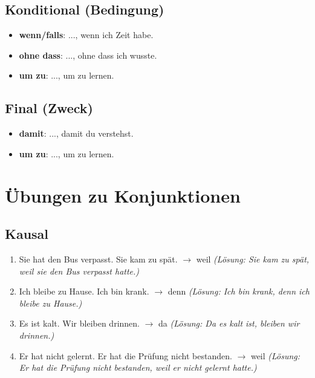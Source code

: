 \subsection{Konditional (Bedingung)}
\begin{itemize}
    \item \textbf{wenn/falls}: ..., wenn ich Zeit habe.
    \item \textbf{ohne dass}: ..., ohne dass ich wusste.
    \item \textbf{um zu}: ..., um zu lernen.
\end{itemize}

\subsection{Final (Zweck)}
\begin{itemize}
    \item \textbf{damit}: ..., damit du verstehst.
    \item \textbf{um zu}: ..., um zu lernen.
\end{itemize}

\section{Übungen zu Konjunktionen}
\label{sec:KonjunktionenUebungen}

\subsection{Kausal}
\begin{enumerate}
    \item Sie hat den Bus verpasst. Sie kam zu spät. $\rightarrow$ weil \quad \textit{(Lösung: Sie kam zu spät, weil sie den Bus verpasst hatte.)}
    \item Ich bleibe zu Hause. Ich bin krank. $\rightarrow$ denn \quad \textit{(Lösung: Ich bin krank, denn ich bleibe zu Hause.)}
    \item Es ist kalt. Wir bleiben drinnen. $\rightarrow$ da \quad \textit{(Lösung: Da es kalt ist, bleiben wir drinnen.)}
    \item Er hat nicht gelernt. Er hat die Prüfung nicht bestanden. $\rightarrow$ weil \quad \textit{(Lösung: Er hat die Prüfung nicht bestanden, weil er nicht gelernt hatte.)}
\end{enumerate}

